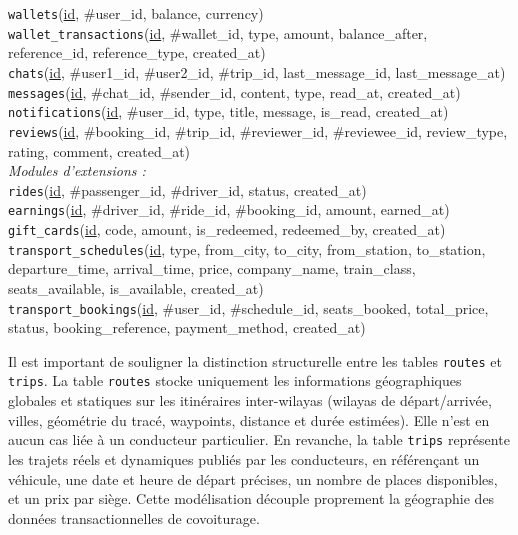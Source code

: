 \begin{highlight}[breakable=false]
\texttt{wallets}(\underline{id}, \#user\_id, balance, currency)\\[1pt]
\texttt{wallet\_transactions}(\underline{id}, \#wallet\_id, type, amount, balance\_after, reference\_id, reference\_type, created\_at)\\[1pt]
\texttt{chats}(\underline{id}, \#user1\_id, \#user2\_id, \#trip\_id, last\_message\_id, last\_message\_at)\\[1pt]
\texttt{messages}(\underline{id}, \#chat\_id, \#sender\_id, content, type, read\_at, created\_at)\\[1pt]
\texttt{notifications}(\underline{id}, \#user\_id, type, title, message, is\_read, created\_at)\\[1pt]
\texttt{reviews}(\underline{id}, \#booking\_id, \#trip\_id, \#reviewer\_id, \#reviewee\_id, review\_type, rating, comment, created\_at)\\[1pt]
\textit{Modules d'extensions :}\\[1pt]
\texttt{rides}(\underline{id}, \#passenger\_id, \#driver\_id, status, created\_at)\\[1pt]
\texttt{earnings}(\underline{id}, \#driver\_id, \#ride\_id, \#booking\_id, amount, earned\_at)\\[1pt]
\texttt{gift\_cards}(\underline{id}, code, amount, is\_redeemed, redeemed\_by, created\_at)\\[1pt]
\texttt{transport\_schedules}(\underline{id}, type, from\_city, to\_city, from\_station, to\_station, departure\_time, arrival\_time, price, company\_name, train\_class, seats\_available, is\_available, created\_at)\\[1pt]
\texttt{transport\_bookings}(\underline{id}, \#user\_id, \#schedule\_id, seats\_booked, total\_price, status, booking\_reference, payment\_method, created\_at)
\end{highlight}

Il est important de souligner la distinction structurelle entre les tables \texttt{routes} et \texttt{trips}. La table \texttt{routes} stocke uniquement les informations géographiques globales et statiques sur les itinéraires inter-wilayas (wilayas de départ/arrivée, villes, géométrie du tracé, waypoints, distance et durée estimées). Elle n'est en aucun cas liée à un conducteur particulier. En revanche, la table \texttt{trips} représente les trajets réels et dynamiques publiés par les conducteurs, en référençant un véhicule, une date et heure de départ précises, un nombre de places disponibles, et un prix par siège. Cette modélisation découple proprement la géographie des données transactionnelles de covoiturage.



